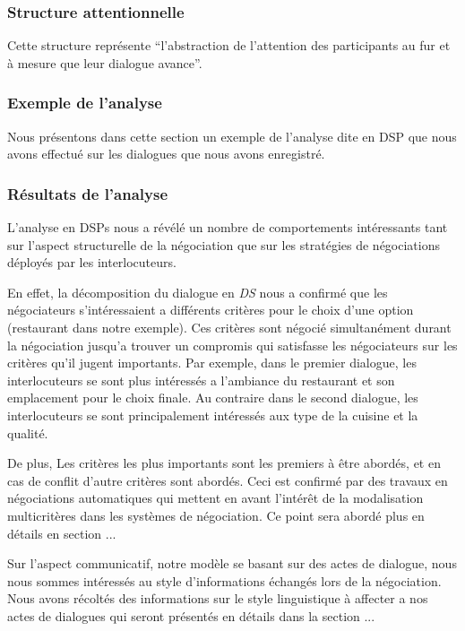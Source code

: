 	\subsubsection{Structure attentionnelle}
	
		Cette structure représente “l'abstraction de l'attention des participants au fur et à mesure que leur dialogue avance”.
	 
	 \subsubsection{Exemple de l'analyse}
		 Nous présentons dans cette section un exemple de l'analyse dite en DSP que nous avons effectué sur les dialogues que nous avons enregistré.
	
	
	
	\subsubsection{Résultats de l'analyse}
		L'analyse en DSPs nous a révélé un nombre de comportements intéressants tant sur l'aspect structurelle de la négociation que sur les stratégies de négociations déployés par les interlocuteurs. 	
		
		En effet, la décomposition du dialogue en \emph{DS} nous a confirmé que les négociateurs s'intéressaient a différents critères pour le choix d'une option (restaurant dans notre exemple). Ces critères sont négocié simultanément durant la négociation jusqu'a trouver un compromis qui satisfasse les négociateurs sur les critères qu'il jugent importants. 
		Par exemple, dans le premier dialogue, les interlocuteurs se sont plus intéressés a l'ambiance du restaurant et son emplacement pour le choix finale. Au contraire dans le second dialogue, les interlocuteurs se sont principalement intéressés aux type de la cuisine et la qualité.
		    
		 De plus, Les critères les plus importants sont les premiers à être abordés, et en cas de conflit d'autre critères sont abordés. 
		 Ceci est confirmé par des travaux en négociations automatiques qui mettent en avant l'intérêt de la modalisation multicritères dans les systèmes de négociation. Ce point sera abordé plus en détails en section ... 
		 
		 Sur l'aspect communicatif, notre modèle se basant sur des actes de dialogue, nous nous sommes intéressés au style d'informations échangés lors de la négociation. Nous avons récoltés des informations sur le style linguistique à affecter a nos actes de dialogues qui seront présentés en détails dans la section ... 
		 
